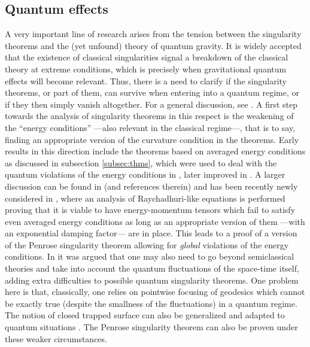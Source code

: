 \documentclass[12pt]{iopart}
\begin{document}
\subsection{Quantum effects}

A very important line of research arises from the tension between the singularity theorems and the (yet unfound) theory of quantum gravity. It is widely accepted that the existence of classical singularities signal a breakdown of the classical theory at extreme conditions, which is precisely when gravitational quantum effects will become relevant. Thus, there is a need to clarify if the singularity theorems, or part of them, can survive when entering into a quantum regime, or if they then simply vanish altogether. For a general discussion, see \cite{Boj}. A first step towards the analysis of singularity theorems in this respect is the weakening of the ``energy conditions'' ---also relevant in the classical regime---, that is to say, finding an appropriate version of the curvature condition in the theorems. Early results in this direction include the theorems based on averaged energy conditions \cite{T6} as discussed in subsection \ref{subsec:thms}, which were used to deal with the quantum violations of the energy conditions in \cite{Rom0}, later improved in \cite{Rom} . A larger discussion can be found in \cite{FeRo} (and references therein) and has been recently newly considered in \cite{FG}, where an analysis of Raychadhuri-like equations is performed proving that it is viable to have energy-momentum tensors which fail to satisfy even averaged energy conditions as long as an appropriate version of them ---with an exponential damping factor--- are in place. This leads to a proof of a version of the Penrose singularity theorem allowing for {\em global} violations of the energy conditions. In \cite{Ford} it was argued that one may also need to go beyond semiclassical theories and take into account the quantum fluctuations of the space-time itself, adding extra difficulties to possible quantum  singularity theorems. One problem here is that, classically, one relies on pointwise  focusing of geodesics which cannot be exactly true (despite the smallness of the fluctuations) in a quantum regime. The notion of closed trapped surface can also be generalized and adapted to quantum situations \cite{Wall}. The Penrose singularity theorem can also be proven under these weaker circumstances.
\end{document}
